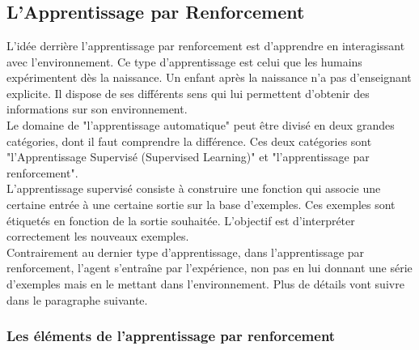 \section{}
\subsection{L'Apprentissage par Renforcement}

L'idée derrière l'apprentissage par renforcement est d'apprendre en interagissant avec l'environnement. Ce type d'apprentissage est celui que les humains expérimentent dès la naissance. Un enfant après la naissance n'a pas d'enseignant explicite. Il dispose de ses différents sens qui lui permettent d'obtenir des informations sur son environnement. \\ 

Le domaine de "l'apprentissage automatique" peut être divisé en deux grandes catégories, dont il faut comprendre la différence. Ces deux catégories sont "l'Apprentissage Supervisé (Supervised Learning)" et "l'apprentissage par renforcement". \\ 

L'apprentissage supervisé consiste à construire une fonction qui associe une certaine entrée à une certaine sortie sur la base d'exemples.  Ces exemples sont étiquetés en fonction de la sortie souhaitée. L'objectif est d'interpréter correctement les nouveaux exemples. \\ 

Contrairement au dernier type d'apprentissage, dans l'apprentissage par renforcement, l'agent s'entraîne par l'expérience, non pas en lui donnant une série d'exemples mais en le mettant dans l'environnement. Plus de détails vont suivre dans le paragraphe suivante. 

\subsubsection{Les éléments de l'apprentissage par renforcement}



